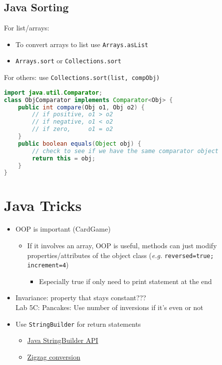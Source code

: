 \documentclass{article}
\newcommand{\eg}[0]{\textit{e.g. }}
\begin{document}
\begin{multicols}{2}
\subsection{Java Sorting}
For list/arrays:
\begin{itemize}
	\item To convert arrays to list use \texttt{Arrays.asList}
	\item \texttt{Arrays.sort} or \texttt{Collections.sort}
\end{itemize}
For others: use \texttt{Collections.sort(list, compObj)}
\begin{lstlisting}[language=Java]
import java.util.Comparator;
class ObjComparator implements Comparator<Obj> {
	public int compare(Obj o1, Obj o2) {
		// if positive, o1 > o2
		// if negative, o1 < o2
		// if zero,     o1 = o2
	}
    public boolean equals(Object obj) {
    	// check to see if we have the same comparator object
    	return this = obj;
    }
}\end{lstlisting}





\section{Java Tricks}
\begin{itemize}
	\item OOP is important (CardGame)
	\begin{itemize}
		\item If it involves an array, OOP is useful, methods can just modify properties/attributes of the object class (\eg \texttt{reversed=true; increment=4})
		\begin{itemize}
			\item Especially true if only need to print statement at the end
		\end{itemize}
	\end{itemize}
	\item Invariance: property that stays constant???\\
	Lab 5C: Pancakes: Use number of inversions if it's even or not
	\item Use \texttt{StringBuilder} for return statements
	\begin{itemize}
		\item \href{https://docs.oracle.com/javase/7/docs/api/java/lang/StringBuilder.html}{Java StringBuilder API}
		\item \href{https://leetcode.com/problems/zigzag-conversion/solution/}{Zigzag conversion}
	\end{itemize}

\end{itemize}
\end{multicols}
\end{document}
